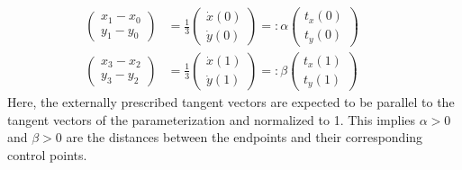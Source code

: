\documentclass{article}
\begin{document}
\begin{align}
  \left(\begin{array}{cc}
    x_1-x_0 \\ y_1-y_0
  \end{array}\right)
  &= \frac{1}{3}
  \left(\begin{array}{cc}
    \dot x(0) \\ \dot y(0)
  \end{array}\right)
  =: \alpha
  \left(\begin{array}{cc}
    t_x(0) \\ t_y(0)
  \end{array}\right) \\
  \left(\begin{array}{cc}
    x_3-x_2 \\ y_3-y_2
  \end{array}\right)
  &= \frac{1}{3}
  \left(\begin{array}{cc}
    \dot x(1) \\ \dot y(1)
  \end{array}\right)
  =: \beta
  \left(\begin{array}{cc}
    t_x(1) \\ t_y(1)
  \end{array}\right) \qquad
\end{align}
%
Here, the externally prescribed tangent vectors are expected to be parallel to
the tangent vectors of the parameterization and normalized to 1. This implies
$\alpha>0$ and $\beta>0$ are the distances between the endpoints and their
corresponding control points.
\end{document}
